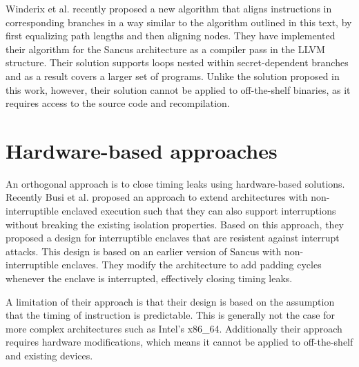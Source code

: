 Winderix et al. \cite{WinderixHans} recently proposed a new algorithm that aligns instructions in corresponding branches in a way similar to the algorithm outlined in this text, 
by first equalizing path lengths and then aligning nodes. 
They have implemented their algorithm for the Sancus architecture as a compiler pass in the LLVM structure. Their solution supports loops nested within secret-dependent branches 
and as a result covers a larger set of programs. Unlike the solution proposed in this work, however, their solution cannot be applied to off-the-shelf binaries, as it requires access to the source code and recompilation.  
 
\section{Hardware-based approaches}
\label{sec:hardware}

An orthogonal approach is to close timing leaks using hardware-based solutions. 
Recently Busi et al. \cite{busi} proposed an approach to extend architectures with non-interruptible enclaved execution such that they can also support interruptions without breaking 
the existing isolation properties. Based on this approach, they proposed  a design for interruptible enclaves that are resistent against interrupt attacks. 
This design is based on an earlier version of Sancus with non-interruptible enclaves. They modify the architecture to add padding cycles whenever the enclave is interrupted, effectively closing timing leaks. 

A limitation of their approach is that their design is based on the assumption that the timing of instruction is predictable. This is generally not the case for more complex architectures such as Intel's x86\_64.
Additionally their approach requires hardware modifications, which means it cannot be applied to off-the-shelf and existing devices. 

